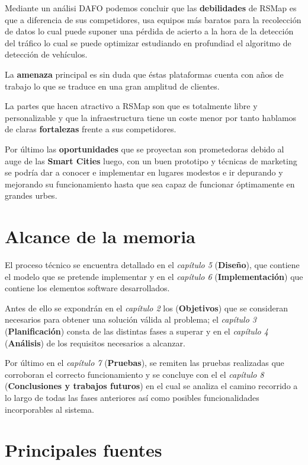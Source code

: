 \newpage

Mediante un análisi DAFO podemos concluir que las \textbf{debilidades} de RSMap es que a diferencia de sus competidores, usa equipos más baratos para la recolección de datos lo cual puede suponer una pérdida de acierto a la hora de la detección del tráfico lo cual se puede optimizar estudiando en profundiad el algoritmo de detección de vehículos.

La \textbf{amenaza} principal es sin duda que éstas plataformas cuenta con años de trabajo lo que se traduce en una gran amplitud de clientes.

La partes que hacen atractivo a RSMap son que es totalmente libre y personalizable y que la infraestructura tiene un coste menor por tanto hablamos de claras \textbf{fortalezas} frente a sus competidores.

Por último las \textbf{oportunidades} que se proyectan son prometedoras debido al auge de las \textbf{Smart Cities} luego, con un buen prototipo y técnicas de marketing se podría dar a conocer e implementar en lugares modestos e ir depurando y mejorando su funcionamiento hasta que sea capaz de funcionar óptimamente en grandes urbes.


\section{Alcance de la memoria}

El proceso técnico se encuentra detallado en el \textit{capítulo 5} (\textbf{Diseño}), que contiene el modelo que se pretende implementar y en el \textit{capítulo 6} (\textbf{Implementación}) que contiene los elementos software desarrollados.

Antes de ello se expondrán en el \textit{capítulo 2}  los (\textbf{Objetivos}) que se consideran necesarios para obtener una solución válida al problema; el \textit{capítulo 3} (\textbf{Planificación}) consta de las distintas fases a superar y en el \textit{capítulo 4}  (\textbf{Análisis}) de los requisitos necesarios a alcanzar.

\bigskip
Por último en el \textit{capítulo 7} (\textbf{Pruebas}), se remiten las pruebas realizadas que corroboran el correcto funcionamiento y se concluye con el el \textit{capítulo 8} (\textbf{Conclusiones y trabajos futuros}) en el cual se analiza el camino recorrido a lo largo de todas las fases anteriores así como posibles funcionalidades incorporables al sistema.

\section{Principales fuentes}
